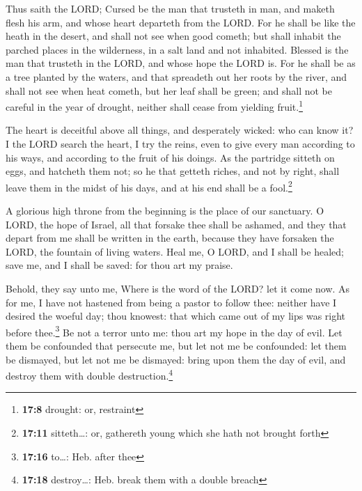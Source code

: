  Thus saith the LORD; Cursed be the man that trusteth in
man, and maketh flesh his arm, and whose heart departeth from the LORD.
 For he shall be like the heath in the desert, and shall
not see when good cometh; but shall inhabit the parched places in the
wilderness, in a salt land and not inhabited.  Blessed is
the man that trusteth in the LORD, and whose hope the LORD is.
 For he shall be as a tree planted by the waters, and that
spreadeth out her roots by the river, and shall not see when heat
cometh, but her leaf shall be green; and shall not be careful in the
year of drought, neither shall cease from yielding fruit.\footnote{\textbf{17:8}
  drought: or, restraint}

 The heart is deceitful above all things, and desperately
wicked: who can know it?  I the LORD search the heart, I
try the reins, even to give every man according to his ways, and
according to the fruit of his doings.  As the partridge
sitteth on eggs, and hatcheth them not; so he that getteth riches, and
not by right, shall leave them in the midst of his days, and at his end
shall be a fool.\footnote{\textbf{17:11} sitteth\ldots: or, gathereth
  young which she hath not brought forth}

 A glorious high throne from the beginning is the place
of our sanctuary.  O LORD, the hope of Israel, all that
forsake thee shall be ashamed, and they that depart from me shall be
written in the earth, because they have forsaken the LORD, the fountain
of living waters.  Heal me, O LORD, and I shall be
healed; save me, and I shall be saved: for thou art my praise.

 Behold, they say unto me, Where is the word of the LORD?
let it come now.  As for me, I have not hastened from
being a pastor to follow thee: neither have I desired the woeful day;
thou knowest: that which came out of my lips was right before
thee.\footnote{\textbf{17:16} to\ldots: Heb. after thee} 
Be not a terror unto me: thou art my hope in the day of evil.
 Let them be confounded that persecute me, but let not me
be confounded: let them be dismayed, but let not me be dismayed: bring
upon them the day of evil, and destroy them with double
destruction.\footnote{\textbf{17:18} destroy\ldots: Heb. break them with
  a double breach}

